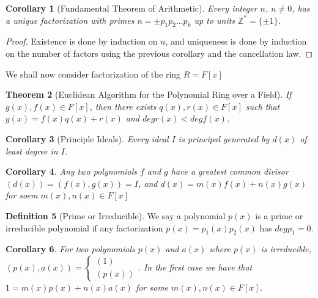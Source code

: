 \documentclass[12pt]{article}
\newtheorem{thm}{Theorem}[section]
\newtheorem{cor}[thm]{Corollary}
\theoremstyle{definition}
\newtheorem{defn}[thm]{Definition}
\theoremstyle{remark}
\numberwithin{equation}{section}
\newcommand\Z{\mathbb Z}    %
\begin{document}
\vspace{15pt}

\begin{cor}[Fundamental Theorem of Arithmetic]
        Every integer $n$, $n \neq 0$, has a unique factorization with primes $n = \pm p_1p_2...p_k$ up to units $\Z^* = \{\pm1\}$.
\end{cor}
\begin{proof}
        Existence is done by induction on $n$, and uniqueness is done by induction on the number of factors using the previous corollary and the cancellation law.
\end{proof}

\vspace{15pt}


We shall now consider factorization of the ring $R = F[x]$

\begin{thm}[Euclidean Algorithm for the Polynomial Ring over a Field]
        If $g(x),f(x) \in F[x]$, then there exists $q(x),r(x) \in F[x]$ such that $g(x) = f(x)q(x) + r(x)$ and $deg r(x) < deg f(x)$.
\end{thm}

\vspace{15pt}

\begin{cor}[Principle Ideals]
        Every ideal $I$ is principal generated by $d(x)$ of least degree in $I$.
\end{cor}

\vspace{15pt}

\begin{cor}
        Any two polynomials $f$ and $g$ have a greatest common divisor $(d(x)) = (f(x),g(x)) = I$, and $d(x) = m(x)f(x) + n(x)g(x)$ for soem $m(x),n(x) \in F[x]$
\end{cor}

\vspace{15pt}

\begin{defn}[Prime or Irreducible]
        We say a polynomial $p(x)$ is a prime or irreducible polynomial if any factorization $p(x) = p_1(x)p_2(x)$ has $deg p_1 = 0$.
\end{defn}


\vspace{15pt}

\begin{cor}
        For two polynomials $p(x)$ and $a(x)$ where $p(x)$ is irreducible, $(p(x),a(x)) = \left\{\begin{array}{c} (1) \\ (p(x)) \end{array}\right.$. In the first case we have that $1 = m(x)p(x) + n(x)a(x)$ for some $m(x),n(x) \in F[x]$.
\end{cor}
\end{document}
